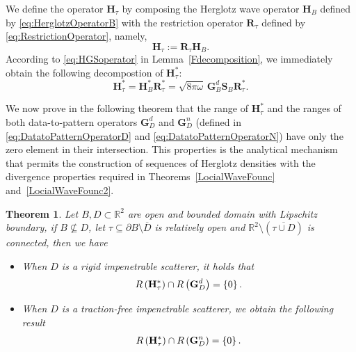 \documentclass[11pt,reqno,twoside]{amsart}
\newtheorem{thm}{Theorem}[section]
\theoremstyle{definition}
\theoremstyle{remark}
\numberwithin{equation}{section}
\begin{document}
We define the operator $\mathbf{H}_{\tau}$ by composing the Herglotz wave operator $\mathbf{H}_B$ defined by \eqref{eq:HerglotzOperatorB} with the restriction operator $\mathbf{R}_{\tau}$ defined by \eqref{eq:RestrictionOperator}, namely,
$$
    \mathbf{H}_{\tau} := \mathbf{R}_{\tau}\mathbf{H}_B.
$$
According to \eqref{eq:HGSoperator} in Lemma~\ref{Fdecomposition}, we immediately obtain the following decompostion of $\mathbf{H}_{\tau}^*$:
\begin{equation}\label{eq:RestriH}
    \mathbf{H}_{\tau}^*
    =
    \mathbf{H}_B^* \mathbf{R}_{\tau}^*
    =
    \sqrt{8\pi\omega}\,\mathbf{G}_B^d \mathbf{S}_B \mathbf{R}_{\tau}^*.
\end{equation}

We now prove in the following theorem that the range of $\mathbf{H}_{\tau}^*$ and the ranges of both data-to-pattern operators $\mathbf{G}_D^d$ and $\mathbf{G}_D^n$ (defined in \eqref{eq:DatatoPatternOperatorD} and \eqref{eq:DatatoPatternOperatorN}) have only the zero element in their intersection. This properties is the analytical mechanism that permits the construction of sequences of Herglotz densities with the divergence properties required in Theorems~\ref{LocialWaveFounc} and~\ref{LocialWaveFounc2}.
    
	\begin{thm}\label{RangeHG}
		Let $B, D \subset \mathbb R^2$ are open and bounded domain with Lipschitz  boundary, if $B \nsubseteq D$, let $\tau \subseteq \partial B \setminus \overline{D} $ is relatively open and $\mathbb R^2 \setminus \left( \overline{\tau \cup D }\right) $ is connected, then we have
			\begin{itemize}
				\item [(1).] When $D$ is a rigid impenetrable scatterer, it holds that
				\begin{align}\notag
					R\left( \mathbf H^*_{\tau} \right) \cap R\left( \mathbf G_D^d\right) =\left\lbrace 0\right\rbrace.
				\end{align}
				\item[(2).] When $D$ is a traction-free impenetrable scatterer, we obtain the following result
				\begin{align}\notag
					R\left( \mathbf H^*_{\tau} \right) \cap R\left( \mathbf G_D^n\right) =\left\lbrace 0\right\rbrace.
				\end{align}
			\end{itemize}
			
	\end{thm}
	
\end{document}
